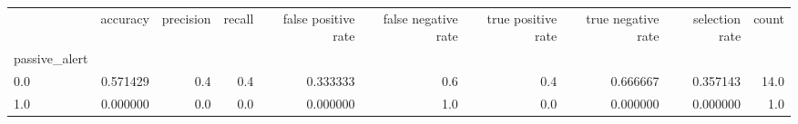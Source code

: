 \begin{tabular}{lrrrrrrrrr}
\toprule
{} &  accuracy &  precision &  recall &  false positive rate &  false negative rate &  true positive rate &  true negative rate &  selection rate &  count \\
passive\_alert &           &            &         &                      &                      &                     &                     &                 &        \\
\midrule
0.0           &  0.571429 &        0.4 &     0.4 &             0.333333 &                  0.6 &                 0.4 &            0.666667 &        0.357143 &   14.0 \\
1.0           &  0.000000 &        0.0 &     0.0 &             0.000000 &                  1.0 &                 0.0 &            0.000000 &        0.000000 &    1.0 \\
\bottomrule
\end{tabular}
